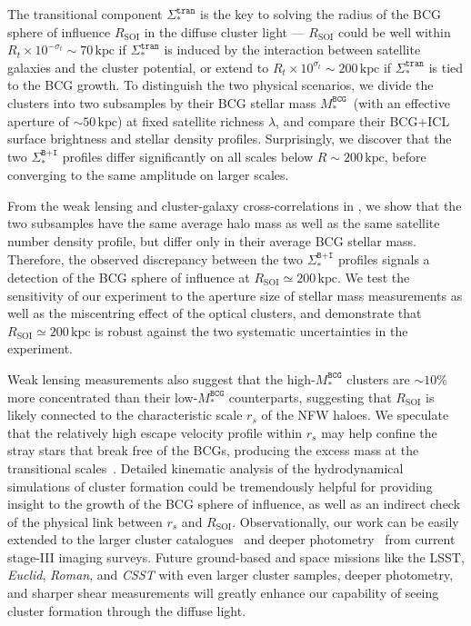 \documentclass[fleqn,usenatbib]{mnras}
\newcommand{\rsoi}{R_{\mathrm{SOI}}}
\newcommand{\sigbi}{\Sigma_*^{\texttt{B+I}}}
\newcommand{\sigtr}{\Sigma_*^{\texttt{tran}}}
\newcommand{\msbcg}{M_*^{\texttt{BCG}}}
\newcommand{\kpc}{\mathrm{kpc}}
\begin{document}
The transitional component $\sigtr$ is the key to solving the radius of the
BCG sphere of influence $\rsoi$ in the diffuse cluster light --- $\rsoi$
could be well within $R_t{\times}10^{-\sigma_t}{\sim}70\,\kpc$ if $\sigtr$
is induced by the interaction between satellite galaxies and the cluster
potential, or extend to $R_t{\times}10^{\sigma_t}{\sim}200\,\kpc$ if
$\sigtr$ is tied to the BCG growth. To distinguish the two physical
scenarios, we divide the clusters into two subsamples by their BCG stellar
mass $\msbcg$~(with an effective aperture of ${\sim}50\,\kpc$) at fixed
satellite richness $\lambda$, and compare their BCG+ICL surface brightness
and stellar density profiles.  Surprisingly, we discover that the two
$\sigbi$ profiles differ significantly on all scales below
$R{\sim}200\,\kpc$, before converging to the same amplitude on larger
scales.


From the weak lensing and cluster-galaxy cross-correlations in
, we show that the two subsamples have the same average
halo mass as well as the same satellite number
density profile, but differ only in their average BCG stellar mass.
Therefore, the observed discrepancy between the two $\sigbi$ profiles
signals a detection of the BCG sphere of influence at
$\rsoi{\simeq}200\,\kpc$.  We test the sensitivity of our experiment to the
aperture size of stellar mass measurements as well as the miscentring
effect of the optical clusters, and demonstrate that $\rsoi{\simeq}200\,\kpc$ is
robust against the two systematic uncertainties in the experiment.


Weak lensing measurements also suggest that the high-$\msbcg$ clusters are
${\sim}10\%$ more concentrated than their low-$\msbcg$ counterparts,
suggesting that $\rsoi$ is likely connected to the characteristic scale
$r_s$ of the NFW haloes. We speculate that the relatively high escape
velocity profile within $r_s$ may help confine the stray stars that break
free of the BCGs, producing the excess mass at the transitional
scales~\citep{Kelson2002, Bender2015, Veale2018}. Detailed kinematic analysis of the hydrodynamical simulations of cluster
formation could be tremendously helpful for providing insight to the growth
of the BCG sphere of influence, as well as an indirect check of the
physical link between $r_s$ and $\rsoi$. Observationally, our work can be
easily extended to the larger cluster catalogues~\citep{Zou2021, Wen2021,
Yang2021} and deeper photometry~\citep{Huang2021, Li2021} from current
stage-III imaging surveys.  Future ground-based and space missions like the
LSST, {\it Euclid}, {\it Roman}, and {\it CSST} with even larger cluster
samples, deeper photometry, and sharper shear measurements will greatly
enhance our capability of seeing cluster formation through the diffuse
light.
\end{document}
